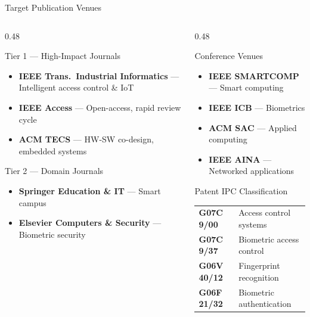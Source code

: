 \documentclass[aspectratio=169, 11pt]{beamer}
\begin{document}
\begin{frame}{Target Publication Venues}
  \begin{columns}[T]
    \begin{column}{0.48\textwidth}
      \begin{block}{Tier 1 — High-Impact Journals}
        \small
        \begin{itemize}
          \item \textbf{IEEE Trans.\ Industrial Informatics} — Intelligent access control \& IoT
          \item \textbf{IEEE Access} — Open-access, rapid review cycle
          \item \textbf{ACM TECS} — HW-SW co-design, embedded systems
        \end{itemize}
      \end{block}
      \vspace{0.2em}
      \begin{block}{Tier 2 — Domain Journals}
        \small
        \begin{itemize}
          \item \textbf{Springer Education \& IT} — Smart campus
          \item \textbf{Elsevier Computers \& Security} — Biometric security
        \end{itemize}
      \end{block}
    \end{column}
    \begin{column}{0.48\textwidth}
      \begin{block}{Conference Venues}
        \small
        \begin{itemize}
          \item \textbf{IEEE SMARTCOMP} — Smart computing
          \item \textbf{IEEE ICB} — Biometrics
          \item \textbf{ACM SAC} — Applied computing
          \item \textbf{IEEE AINA} — Networked applications
        \end{itemize}
      \end{block}
      \vspace{0.2em}
      \begin{block}{Patent IPC Classification}
        \small
        \begin{tabular}{ll}
          \textbf{G07C 9/00} & Access control systems \\
          \textbf{G07C 9/37} & Biometric access control \\
          \textbf{G06V 40/12} & Fingerprint recognition \\
          \textbf{G06F 21/32} & Biometric authentication \\
        \end{tabular}
      \end{block}
    \end{column}
  \end{columns}
\end{frame}
\end{document}
